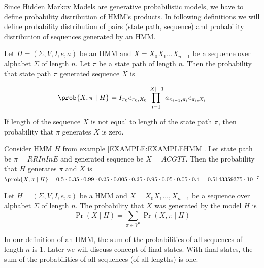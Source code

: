 
Since Hidden Markov Models are generative probabilistic models, we have to
define probability distribution of HMM's products. In following definitions we
will define probability distribution of pairs (state path, sequence) and
probability distribution of sequences generated by an HMM.

\begin{definition}
Let $H=(\Sigma,V,I,e,a)$ be an HMM and $X=X_0X_1\dots X_{n-1}$ be a sequence over
alphabet $\Sigma$ of length $n$. Let $\pi$ be a state path of length $n$. Then the
probability that state path $\pi$ generated sequence $X$ is 

\[\prob{X,\pi\mid H}=
I_{\pi_0}e_{\pi_0,X_0}\prod_{i=1}^{|X|-1}a_{\pi_{i-1},\pi_i}e_{\pi_i,X_i}\]

If length of the sequence $X$ is not equal to length of the state path $\pi$,
then
probability that $\pi$ generates $X$ is zero.
\end{definition}



\begin{example}
Consider HMM $H$ from example \ref{EXAMPLE:EXAMPLEHMM}. Let state path be $\pi=RRInInE$ and
generated sequence be $X=ACGTT$. Then the probability that $H$ generates $\pi$
and $X$ is 
$\prob{ X,\pi\mid H } = 0.5 \cdot 0.35 \cdot 0.99 \cdot 0.25 \cdot 0.005 \cdot 0.25 \cdot 0.95 \cdot 0.05 \cdot 0.05 \cdot 0.4 =
0.5143359375  \cdot  10^{-7}$
\end{example}

\begin{definition}
Let $H=(\Sigma,V,I,e,a)$ be a HMM and $X=X_0X_1\dots,X_{n-1}$ be a sequence over
alphabet $\Sigma$ of length $n$. The probability that $X$ was generated by the
model $H$ is 
\[\Pr\left(X\mid H\right)=\sum_{\pi\in V^n}\Pr\left(X,\pi\mid H\right)\]
\end{definition}



\begin{note}
In our  definition of an HMM, the sum of the probabilities of all sequences of
length $n$ is $1$. Later we will discuss concept of final states. With final
states, the sum of the probabilities of all sequences (of all lengths) is one.

\end{note}

